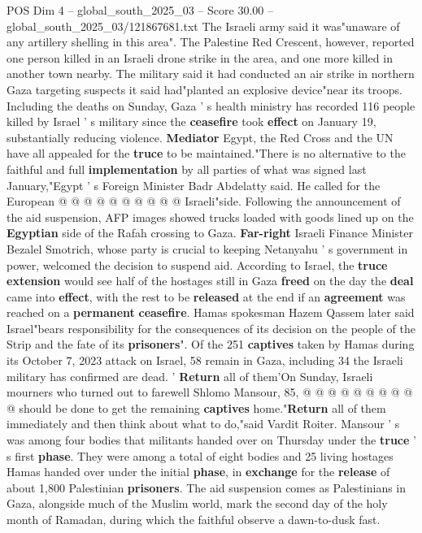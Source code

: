 \begin{textsample}{POS Dim 4 – global\_south\_2025\_03 – Score 30.00 – global\_south\_2025\_03/121867681.txt}
The Israeli army said it was"unaware of any artillery shelling in this area".
The Palestine Red Crescent, however, reported one person killed in an Israeli drone strike in the area, and one more killed in another town nearby.
The military said it had conducted an air strike in northern Gaza targeting suspects it said had"planted an explosive device"near its troops.
Including the deaths on Sunday, Gaza ' s health ministry has recorded 116 people killed by Israel ' s military since the \textbf{ceasefire} took \textbf{effect} on January 19, substantially reducing violence. \textbf{Mediator} Egypt, the Red Cross and the UN have all appealed for the \textbf{truce} to be maintained."There is no alternative to the faithful and full \textbf{implementation} by all parties of what was signed last January,"Egypt ' s Foreign Minister Badr Abdelatty said.
He called for the European @ @ @ @ @ @ @ @ @ @ Israeli"side.
Following the announcement of the aid suspension, AFP images showed trucks loaded with goods lined up on the \textbf{Egyptian} side of the Rafah crossing to Gaza. \textbf{Far-right} Israeli Finance Minister Bezalel Smotrich, whose party is crucial to keeping Netanyahu ' s government in power, welcomed the decision to suspend aid.
According to Israel, the \textbf{truce} \textbf{extension} would see half of the hostages still in Gaza \textbf{freed} on the day the \textbf{deal} came into \textbf{effect}, with the rest to be \textbf{released} at the end if an \textbf{agreement} was reached on a \textbf{permanent} \textbf{ceasefire}.
Hamas spokesman Hazem Qassem later said Israel"bears responsibility for the consequences of its decision on the people of the Strip and the fate of its \textbf{prisoners}".
Of the 251 \textbf{captives} taken by Hamas during its October 7, 2023 attack on Israel, 58 remain in Gaza, including 34 the Israeli military has confirmed are dead. ' \textbf{Return} all of them'On Sunday, Israeli mourners who turned out to farewell Shlomo Mansour, 85, @ @ @ @ @ @ @ @ @ @ should be done to get the remaining \textbf{captives} home."\textbf{Return} all of them immediately and then think about what to do,"said Vardit Roiter.
Mansour ' s was among four bodies that militants handed over on Thursday under the \textbf{truce} ' s first \textbf{phase}.
They were among a total of eight bodies and 25 living hostages Hamas handed over under the initial \textbf{phase}, in \textbf{exchange} for the \textbf{release} of about 1,800 Palestinian \textbf{prisoners}.
The aid suspension comes as Palestinians in Gaza, alongside much of the Muslim world, mark the second day of the holy month of Ramadan, during which the faithful observe a dawn-to-dusk fast.

\end{textsample}

